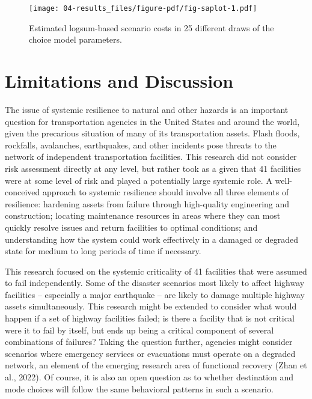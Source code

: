 \documentclass[
  letterpaper,
  number,
  review,
  3p]{elsarticle}
\begin{document}
\begin{figure}

{\centering \texttt{[image: 04-results\_files/figure-pdf/fig-saplot-1.pdf]}

}

\caption{\label{fig-saplot}Estimated logsum-based scenario costs in 25
different draws of the choice model parameters.}

\end{figure}


\hypertarget{limitations-and-discussion}{%
\section{Limitations and Discussion}\label{limitations-and-discussion}}

The issue of systemic resilience to natural and other hazards is an
important question for transportation agencies in the United States and
around the world, given the precarious situation of many of its
transportation assets. Flash floods, rockfalls, avalanches, earthquakes,
and other incidents pose threats to the network of independent
transportation facilities. This research did not consider risk
assessment directly at any level, but rather took as a given that 41
facilities were at some level of risk and played a potentially large
systemic role. A well-conceived approach to systemic resilience should
involve all three elements of resilience: hardening assets from failure
through high-quality engineering and construction; locating maintenance
resources in areas where they can most quickly resolve issues and return
facilities to optimal conditions; and understanding how the system could
work effectively in a damaged or degraded state for medium to long
periods of time if necessary.

This research focused on the systemic criticality of 41 facilities that
were assumed to fail independently. Some of the disaster scenarios most
likely to affect highway facilities -- especially a major earthquake --
are likely to damage multiple highway assets simultaneously. This
research might be extended to consider what would happen if a set of
highway facilities failed; is there a facility that is not critical were
it to fail by itself, but ends up being a critical component of several
combinations of failures? Taking the question further, agencies might
consider scenarios where emergency services or evacuations must operate
on a degraded network, an element of the emerging research area of
functional recovery (Zhan et al., 2022). Of course, it is also an open
question as to whether destination and mode choices will follow the same
behavioral patterns in such a scenario.
\end{document}
